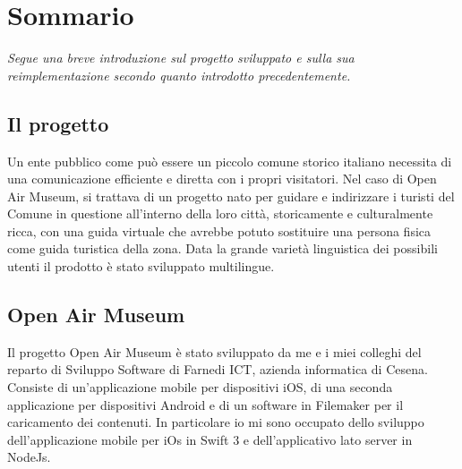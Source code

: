 \chapter*{Sommario} %
\label{sommario}

\vspace{5mm}

\emph{Segue una breve introduzione sul progetto sviluppato e sulla sua reimplementazione secondo quanto introdotto precedentemente.} \vspace{5mm}

\section{Il progetto}\vspace{5mm}

Un ente pubblico come può essere un piccolo comune storico italiano necessita di una comunicazione efficiente e diretta con i propri visitatori. Nel caso di Open Air Museum, si trattava di un progetto nato per guidare e indirizzare i turisti del Comune in questione all’interno della loro città, storicamente e culturalmente ricca, con una guida virtuale che avrebbe potuto sostituire una persona fisica come guida turistica della zona. Data la grande varietà linguistica dei possibili utenti il prodotto è stato sviluppato multilingue.

\section{Open Air Museum}\vspace{5mm}

Il progetto Open Air Museum è stato sviluppato da me e i miei colleghi del reparto di Sviluppo Software di Farnedi ICT, azienda informatica di Cesena. Consiste di un’applicazione mobile per dispositivi iOS, di una seconda applicazione per dispositivi Android e di un software in Filemaker per il caricamento dei contenuti. In particolare io mi sono occupato dello sviluppo dell’applicazione mobile per iOs in Swift 3 e dell’applicativo lato server in NodeJs. \vspace{5mm}


